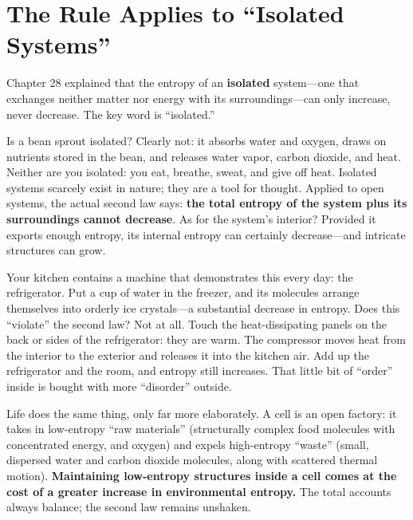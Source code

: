 \section{The Rule Applies to ``Isolated Systems''}

Chapter 28 explained that the entropy of an \textbf{isolated} system---one that exchanges neither matter nor energy with its surroundings---can only increase, never decrease. The key word is ``isolated.''

Is a bean sprout isolated? Clearly not: it absorbs water and oxygen, draws on nutrients stored in the bean, and releases water vapor, carbon dioxide, and heat. Neither are you isolated: you eat, breathe, sweat, and give off heat. Isolated systems scarcely exist in nature; they are a tool for thought. Applied to open systems, the actual second law says: \textbf{the total entropy of the system plus its surroundings cannot decrease}. As for the system's interior? Provided it exports enough entropy, its internal entropy can certainly decrease---and intricate structures can grow.

Your kitchen contains a machine that demonstrates this every day: the refrigerator. Put a cup of water in the freezer, and its molecules arrange themselves into orderly ice crystals---a substantial decrease in entropy. Does this ``violate'' the second law? Not at all. Touch the heat-dissipating panels on the back or sides of the refrigerator: they are warm. The compressor moves heat from the interior to the exterior and releases it into the kitchen air. Add up the refrigerator and the room, and entropy still increases. That little bit of ``order'' inside is bought with more ``disorder'' outside.

Life does the same thing, only far more elaborately. A cell is an open factory: it takes in low-entropy ``raw materials'' (structurally complex food molecules with concentrated energy, and oxygen) and expels high-entropy ``waste'' (small, dispersed water and carbon dioxide molecules, along with scattered thermal motion). \textbf{Maintaining low-entropy structures inside a cell comes at the cost of a greater increase in environmental entropy.} The total accounts always balance; the second law remains unshaken.

